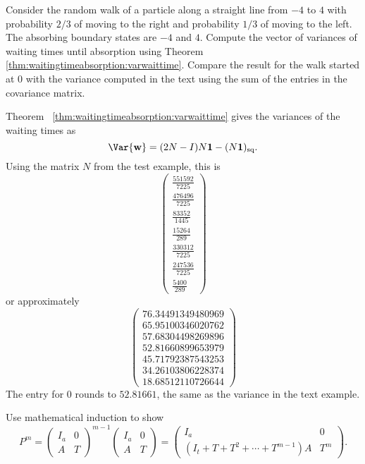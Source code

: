 \documentclass[12pt]{article}
\begin{document}
\begin{exercise}
    Consider the random walk of a particle along a straight line from \(
    -4 \) to \( 4 \) with probability \( 2/3 \) of moving to the right
    and probability \( 1/3 \) of moving to the left.  The absorbing
    boundary states are \( -4 \) and \( 4 \).  Compute the vector of
    variances of waiting times until absorption using Theorem~%
    \ref{thm:waitingtimeabsorption:varwaittime}.  Compare the result for
    the walk started at \( 0 \) with the variance computed in the text
    using the sum of the entries in the covariance matrix.
\end{exercise}
\begin{solution}
    Theorem~%
    \ref{thm:waitingtimeabsorption:varwaittime} gives the variances of
    the waiting times as
    \[
        \Var{\mathbf{w}} = (2N - I)N\mathbf{1} - (N\mathbf{1})_{\text{sq}}.
    \] Using the matrix \( N \) from the test example, this is
    \[
        \begin{pmatrix}
            \frac{551592}{7225}\\
            \frac{476496}{7225}\\
            \frac{83352}{1445}\\
            \frac{15264}{289}\\
            \frac{330312}{7225}\\
            \frac{247536}{7225}\\
            \frac{5400}{289}
        \end{pmatrix}
    \] or approximately
    \[
        \begin{pmatrix}
            76.34491349480969\\
            65.95100346020762\\
            57.68304498269896\\
            52.81660899653979\\
            45.71792387543253\\
            34.26103806228374\\
            18.68512110726644
        \end{pmatrix}
    \] The entry for \( 0 \) rounds to \( 52.81661 \), the same as the
    variance in the text example.
\end{solution}

\begin{exercise}
    Use mathematical induction to show
    \[
        P^{m} =
        \begin{pmatrix}
            I_a & 0 \\
            A & T
        \end{pmatrix}
        ^{m-1}
        \begin{pmatrix}
            I_a & 0 \\
            A & T
        \end{pmatrix}
        =
        \begin{pmatrix}
            I_a & 0 \\
            (I_t + T + T^2 + \cdots + T^{m-1})A & T^m
        \end{pmatrix}
        .
    \]
\end{exercise}
\end{document}
